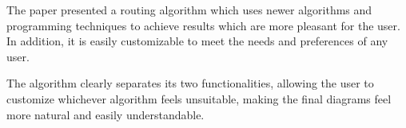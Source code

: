 The paper presented a routing algorithm which uses newer algorithms and
programming techniques to achieve results which are more pleasant for the
user. In addition, it is easily customizable to meet the needs and 
preferences of any user.

The algorithm clearly separates its two functionalities, allowing the 
user to customize whichever algorithm feels unsuitable, making the 
final diagrams feel more natural and easily understandable.
